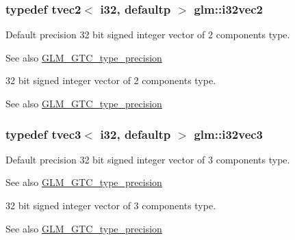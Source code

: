 \subsubsection[{i32vec2}]{\setlength{\rightskip}{0pt plus 5cm}typedef tvec2$<$ i32, defaultp $>$ {\bf glm\+::i32vec2}}\label{group__gtc__type__precision_ga25820e641988fe33b075d80434872d02}
Default precision 32 bit signed integer vector of 2 components type. \begin{DoxySeeAlso}{See also}
\hyperlink{group__gtc__type__precision}{G\+L\+M\+\_\+\+G\+T\+C\+\_\+type\+\_\+precision}
\end{DoxySeeAlso}
32 bit signed integer vector of 2 components type. \begin{DoxySeeAlso}{See also}
\hyperlink{group__gtc__type__precision}{G\+L\+M\+\_\+\+G\+T\+C\+\_\+type\+\_\+precision} 
\end{DoxySeeAlso}
\hypertarget{group__gtc__type__precision_gab67e08f6a4b1bce82a9a34ecb2bfba64}{}
\subsubsection[{i32vec3}]{\setlength{\rightskip}{0pt plus 5cm}typedef tvec3$<$ i32, defaultp $>$ {\bf glm\+::i32vec3}}\label{group__gtc__type__precision_gab67e08f6a4b1bce82a9a34ecb2bfba64}
Default precision 32 bit signed integer vector of 3 components type. \begin{DoxySeeAlso}{See also}
\hyperlink{group__gtc__type__precision}{G\+L\+M\+\_\+\+G\+T\+C\+\_\+type\+\_\+precision}
\end{DoxySeeAlso}
32 bit signed integer vector of 3 components type. \begin{DoxySeeAlso}{See also}
\hyperlink{group__gtc__type__precision}{G\+L\+M\+\_\+\+G\+T\+C\+\_\+type\+\_\+precision} 
\end{DoxySeeAlso}
\hypertarget{group__gtc__type__precision_ga3ada3676600db65a425058c0a150d83e}{}
